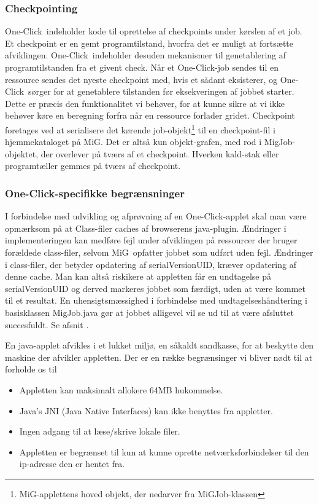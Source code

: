 \documentclass[pdf,draft,a4paper,11pt]{article}
\newcommand{\mig}{MiG}
\newcommand{\oc}{One-Click}
\begin{document}
\subsubsection{Checkpointing}
\oc\ indeholder kode til oprettelse af checkpoints under kørslen af et job. Et checkpoint er en gemt programtilstand, hvorfra det er muligt at fortsætte afviklingen. \oc\ indeholder desuden mekanismer til genetablering af programtilstanden fra et givent check. Når et \oc-job sendes til en ressource sendes det nyeste checkpoint med, hvis et sådant eksisterer, og \oc\ sørger for at genetablere tilstanden før eksekveringen af jobbet starter. Dette er præcis den funktionalitet vi behøver, for at kunne sikre at vi ikke behøver køre en beregning forfra når en ressource forlader gridet.
Checkpoint foretages ved at serialisere det kørende job-objekt\footnote{\mig-applettens hoved objekt, der nedarver fra MiGJob-klassen} til en checkpoint-fil i hjemmekataloget på \mig. Det er altså kun objekt-grafen, med rod i MigJob-objektet, der overlever på tværs af et checkpoint. Hverken kald-stak eller programtæller gemmes på tværs af checkpoint.

\subsubsection{\oc-specifikke begrænsninger}

I forbindelse med udvikling og afprøvning af en \oc-applet skal man være
opmærksom på at Class-filer caches af browserens java-plugin. Ændringer i
implementeringen kan medføre fejl under afviklingen på ressourcer der bruger
forældede class-filer, selvom \mig\ opfatter jobbet som udført uden fejl. Ændringer i class-filer, der betyder opdatering af serialVersionUID, kræver opdatering af denne cache. Man kan altså riskikere at appletten får en undtagelse på serialVersionUID og derved markeres jobbet som færdigt, uden at være kommet til et resultat. En uhensigtsmæssighed i forbindelse med undtagelseshåndtering i basisklassen MigJob.java gør at jobbet alligevel vil se ud til at være afsluttet succesfuldt. Se afsnit \cite{bugs}. 

En java-applet afvikles i et lukket miljø, en såkaldt sandkasse, for at beskytte den maskine der afvikler appletten. Der er en række begrænsinger vi bliver nødt til at forholde os til
\begin{itemize}
	\item Appletten kan maksimalt allokere 64MB hukommelse.
	\item Java's JNI (Java Native Interfaces) kan ikke benyttes fra appletter. 
	\item Ingen adgang til at læse/skrive lokale filer.
	\item Appletten er begrænset til kun at kunne oprette netværksforbindelser til den ip-adresse den er hentet fra.
\end{itemize}
\end{document}
